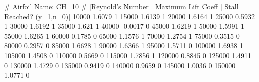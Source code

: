 # Airfoil Name: CH_10
# |Reynold's Number | Maximum Lift Coeff | Stall Reached? (y=1,n=0)|
10000 1.6079 1
15000 1.6139 1
20000 1.6164 1
25000 0.5932 1
30000 1.6192 1
35000 1.621 1
40000 -0.0017 0
45000 1.6219 1
50000 1.5991 1
55000 1.6265 1
60000 0.1785 0
65000 1.1576 1
70000 1.2754 1
75000 0.3515 0
80000 0.2957 0
85000 1.6628 1
90000 1.6366 1
95000 1.5711 0
100000 1.6938 1
105000 1.4508 0
110000 0.5669 0
115000 1.7856 1
120000 0.8845 0
125000 1.4911 0
130000 1.4729 0
135000 0.9419 0
140000 0.9659 0
145000 1.0036 0
150000 1.0771 0
